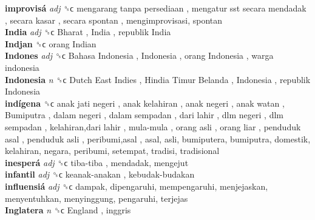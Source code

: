 \textbf{improvisá} \emph{adj}  ␝ϲ   mengarang tanpa persediaan ,  mengatur sst secara mendadak ,  secara kasar ,  secara spontan , mengimprovisasi, spontan  \\
\textbf{India} \emph{adj}  ␝ϲ   Bharat ,  India ,  republik India   \\
\textbf{Indjan} ␝ϲ   orang Indian   \\
\textbf{Indones} \emph{adj}  ␝ϲ   Bahasa Indonesia ,  Indonesia ,  orang Indonesia ,  warga indonesia   \\
\textbf{Indonesia} \emph{n}  ␝ϲ   Dutch East Indies ,  Hindia Timur Belanda ,  Indonesia ,  republik Indonesia   \\
\textbf{indígena} ␝ϲ   anak jati negeri ,  anak kelahiran ,  anak negeri ,  anak watan ,  Bumiputra ,  dalam negeri ,  dalam sempadan ,  dari lahir ,  dlm negeri ,  dlm sempadan ,  kelahiran,dari lahir ,  mula-mula ,  orang asli ,  orang liar ,  penduduk asal ,  penduduk asli ,  peribumi,asal , asal, asli, bumiputera, bumiputra, domestik, kelahiran, negara, peribumi, setempat, tradisi, tradisional  \\
\textbf{inesperá} \emph{adj}  ␝ϲ   tiba-tiba , mendadak, mengejut  \\
\textbf{infantil} \emph{adj}  ␝ϲ   keanak-anakan ,  kebudak-budakan   \\
\textbf{influensiá} \emph{adj}  ␝ϲ  dampak, dipengaruhi, mempengaruhi, menjejaskan, menyentuhkan, menyinggung, pengaruhi, terjejas  \\
\textbf{Inglatera} \emph{n}  ␝ϲ   England , inggris  \\
